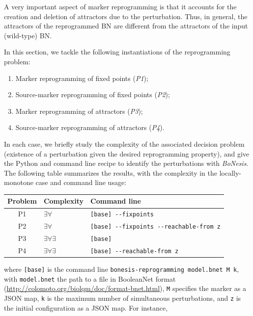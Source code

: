 \documentclass[PCJ,Unicode,screen,mode=plain]{cedram}
\begin{document}
A very important aspect of marker reprogramming is that it accounts for
the creation and deletion of attractors due to the perturbation. Thus,
in general, the attractors of the reprogrammed BN are different from the
attractors of the input (wild-type) BN.

In this section, we tackle the following instantiations of the
reprogramming problem:

\begin{enumerate}
\def\labelenumi{\arabic{enumi}.}
\item
  Marker reprogramming of fixed points (\emph{P1});
\item
  Source-marker reprogramming of fixed points (\emph{P2});
\item
  Marker reprogramming of attractors (\emph{P3});
\item
  Source-marker reprogramming of attractors (\emph{P4}).
\end{enumerate}

In each case, we briefly study the complexity of the associated decision
problem (existence of a perturbation given the desired reprogramming
property), and give the Python and command line recipe to identify the
perturbations with \emph{BoNesis}. The following table summarizes the
results, with the complexity in the locally-monotone case and command
line usage:

\begin{longtable}[]{@{}cll@{}}
\toprule()
Problem & Complexity & Command line \\
\midrule()
\endhead
P1 & \(\exists\forall\) & \texttt{{[}base{]}\ -\/-fixpoints} \\
P2 & \(\exists\forall\) &
\texttt{{[}base{]}\ -\/-fixpoints\ -\/-reachable-from\ z} \\
P3 & \(\exists\forall\exists\) & \texttt{{[}base{]}} \\
P4 & \(\exists\forall\exists\) &
\texttt{{[}base{]}\ -\/-reachable-from\ z} \\
\bottomrule()
\end{longtable}

\noindent
where \texttt{{[}base{]}} is the command line
\texttt{bonesis-reprogramming\ model.bnet\ M\ k}, with
\texttt{model.bnet} the path to a file in
BooleanNet
format (\href{http://colomoto.org/biolqm/doc/format-bnet.html}{http://colomoto.org/biolqm/doc/format-bnet.html}), \texttt{M} specifies the marker as a JSON map, \texttt{k} is
the maximum number of simultaneous perturbations, and \texttt{z} is the
initial configuration as a JSON map. For instance,
\end{document}
